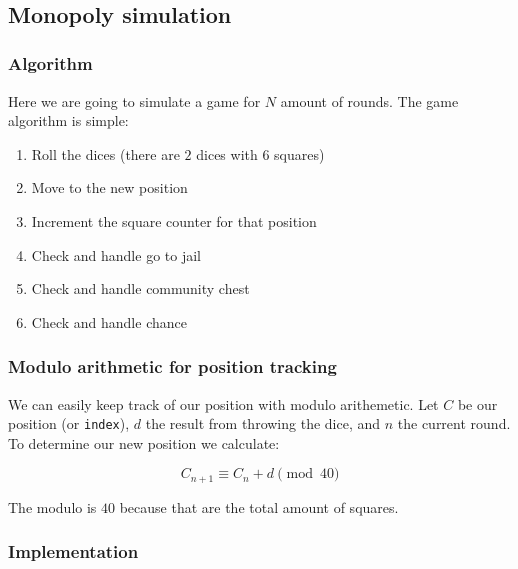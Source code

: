 \documentclass[11pt]{article}
\providecommand{\tightlist}{%
      \setlength{\itemsep}{0pt}\setlength{\parskip}{0pt}}
\begin{document}
    \begin{center}
    \end{center}
    { \hspace*{\fill} \\}
    
    \hypertarget{monopoly-simulation}{%
\subsection{Monopoly simulation}\label{monopoly-simulation}}

    \hypertarget{algorithm}{%
\subsubsection{Algorithm}\label{algorithm}}

    Here we are going to simulate a game for \(N\) amount of rounds. The
game algorithm is simple:

\begin{enumerate}
\def\labelenumi{\arabic{enumi}.}
\tightlist
\item
  Roll the dices (there are \(2\) dices with \(6\) squares)
\item
  Move to the new position
\item
  Increment the square counter for that position
\item
  Check and handle go to jail
\item
  Check and handle community chest
\item
  Check and handle chance
\end{enumerate}

    \hypertarget{modulo-arithmetic-for-position-tracking}{%
\subsubsection{Modulo arithmetic for position
tracking}\label{modulo-arithmetic-for-position-tracking}}

    We can easily keep track of our position with modulo arithemetic. Let
\(C\) be our position (or \texttt{index}), \(d\) the result from
throwing the dice, and \(n\) the current round. To determine our new
position we calculate:

\[ C_{n+1} \equiv C_n+d \pmod{40}\]

    The modulo is \(40\) because that are the total amount of squares.

    \hypertarget{implementation}{%
\subsubsection{Implementation}\label{implementation}}
\end{document}
